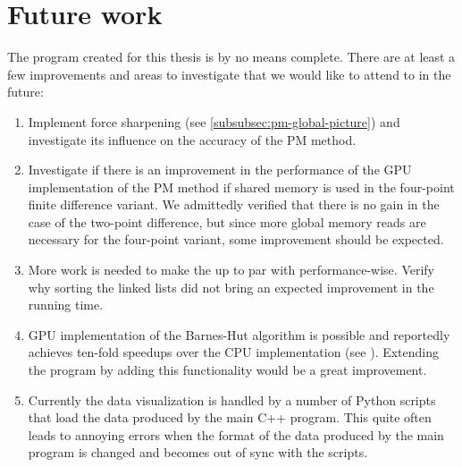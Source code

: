 \section{Future work}
The program created for this thesis is by no means complete.
There are at least a few improvements and areas to investigate that we would like to attend to in the future:
\begin{enumerate}
      \item Implement force sharpening (see \autoref{subsubsec:pm-global-picture}) and investigate its influence on the accuracy of the PM method.
      \item Investigate if there is an improvement in the performance of the GPU implementation of the PM method if shared memory is used in the four-point finite difference variant.
            We admittedly verified that there is no gain in the case of the two-point difference, but since more global memory reads are necessary for the four-point variant, some improvement should be expected.
      \item More work is needed to make the \PThreeM{} up to par with performance-wise. Verify why sorting the linked lists did not bring an expected improvement in the running time.
      \item GPU implementation of the Barnes-Hut algorithm is possible and reportedly achieves ten-fold speedups over the CPU implementation (see \cite{BURTSCHER201175}).
            Extending the program by adding this functionality would be a great improvement.
      \item Currently the data visualization is handled by a number of Python scripts that load the data produced by the main C++ program.
            This quite often leads to annoying errors when the format of the data produced by the main program is changed and becomes out of sync with the scripts.
\end{enumerate}